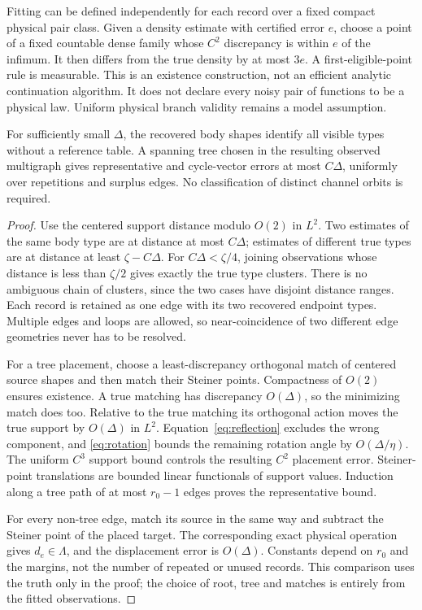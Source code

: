 Fitting can be defined independently for each record over a fixed compact
physical pair class. Given a density estimate with certified error $e$,
choose a point of a fixed countable dense family whose $C^2$ discrepancy
is within $e$ of the infimum. It then differs from the true density by
at most $3e$. A first-eligible-point rule is measurable. This is an
existence construction, not an efficient analytic continuation algorithm.
It does not declare every noisy pair of functions to be a physical law.
Uniform physical branch validity remains a model assumption.

\begin{lemma}
\label{lem:reference-free-assembly}
For sufficiently small $\Delta$, the recovered body shapes identify
all visible types without a reference table. A spanning tree chosen in
the resulting observed multigraph gives representative and cycle-vector
errors at most $C\Delta$, uniformly over repetitions and surplus edges.
No classification of distinct channel orbits is required.
\end{lemma}
\begin{proof}
Use the centered support distance modulo $O(2)$ in $L^2$. Two estimates
of the same body type are at distance at most $C\Delta$; estimates
of different true types are at distance at least $\zeta-C\Delta$.
For $C\Delta<\zeta/4$, joining observations whose distance is less
than $\zeta/2$ gives exactly the true type clusters. There is no
ambiguous chain of clusters, since the two cases have disjoint distance
ranges. Each record is retained as one edge with its two recovered
endpoint types. Multiple edges and loops are allowed, so near-coincidence
of two different edge geometries never has to be resolved.

For a tree placement, choose a least-discrepancy orthogonal match of
centered source shapes and then match their Steiner points. Compactness
of $O(2)$ ensures existence. A true matching has discrepancy $O(\Delta)$,
so the minimizing match does too. Relative to the true matching its
orthogonal action moves the true support by $O(\Delta)$ in $L^2$.
Equation~\eqref{eq:reflection} excludes the wrong component, and
\eqref{eq:rotation} bounds the remaining rotation angle by
$O(\Delta/\eta)$. The uniform $C^3$ support bound controls the
resulting $C^2$ placement error. Steiner-point translations are bounded
linear functionals of support values. Induction along a tree path of
at most $r_0-1$ edges proves the representative bound.

For every non-tree edge, match its source in the same way and subtract
the Steiner point of the placed target. The corresponding exact physical
operation gives $d_e\in\Lambda$, and the displacement error is
$O(\Delta)$. Constants depend on $r_0$ and the margins, not the
number of repeated or unused records. This comparison uses the truth
only in the proof; the choice of root, tree and matches is entirely
from the fitted observations.
\end{proof}

